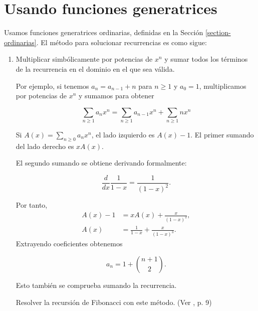 \section{Usando funciones
generatrices}\label{sec-res-rec-fg}
Usamos funciones generatrices ordinarias,
definidas en la Sección
\ref{section-ordinarias}.
El método para solucionar recurrencias es
como sigue:
\begin{enumerate}
\item Multiplicar simbólicamente por
potencias de $x^n$ y sumar todos los términos
de la recurrencia en el dominio en el que sea
válida.

Por ejemplo, si tenemos $a_n = a_{n-1} + n$
para $n\geq1$ y $a_0 = 1$, multiplicamos por
potencias de $x^n$ y sumamos para obtener

$$
 \sum_{n\geq1}a_nx^n =  \sum_{n\geq
1}a_{n-1}x^n +  \sum_{n\geq1}nx^n
$$

Si $A(x) =  \sum_{n\geq0}a_nx^n$, el lado
izquierdo es $A(x)-1$. El primer sumando del
lado derecho es $xA(x)$.

El segundo sumando se obtiene derivando
formalmente:

$$
\frac{d}{dx}\frac{1}{1-x}=\frac{1}{(1-x)^2}.
$$

Por tanto,
$$
\begin{aligned}
A(x)-1&=xA(x)+\frac{x}{(1-x)^2},\\
A(x)&=\frac{1}{1-x}+\frac{x}{(1-x)^3}.
\end{aligned}
$$
Extrayendo coeficientes obtenemos

$$
a_n=1+{n+1\choose2}.
$$

Esto también se comprueba sumando la
recurrencia.
\begin{exercise}
\label{exercise-combi-001}
Resolver la recursión de Fibonacci con este
método. (Ver \cite{generatingfunctionology},
p. 9)
\end{exercise}

\end{enumerate}
